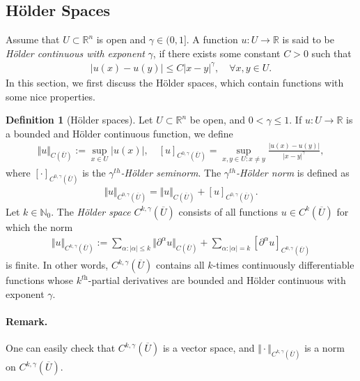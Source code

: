 \documentclass{article}
\numberwithin{equation}{section}
\newcommand{\bbR}{\mathbb{R}}
\newcommand{\ol}{\overline}
\theoremstyle{plain}
\theoremstyle{definition}
\newtheorem{definition}[theorem]{Definition}
\begin{document}
\subsection{Hölder Spaces}
Assume that $U\subset\bbR^n$ is open and $\gamma\in(0,1]$. A function $u:U\to\bbR$ is said to be \textit{Hölder continuous with exponent} $\gamma$, if there exists some constant $C>0$ such that
\begin{align*}
	\vert u(x)-u(y)\vert\leq C\vert x-y\vert^\gamma,\quad\forall x,y\in U.
\end{align*}
In this section, we first discuss the Hölder spaces, which contain functions with some nice properties.
\begin{definition}[Hölder spaces]\label{def:2.1}
Let $U\subset\bbR^n$ be open, and $0<\gamma\leq 1$. If $u:U\to\bbR$ is a bounded and Hölder continuous function, we define 
\begin{align*}
	\Vert u\Vert_{C(\overline{U})}:=\sup_{x\in U}\vert u(x)\vert,\quad [u]_{C^{0,\gamma}(\overline{U})}=\sup_{x,y\in U:x\neq y}\frac{\vert u(x)-u(y)\vert}{\vert x-y\vert^\gamma},
\end{align*}
where $[\cdot]_{C^{0,\gamma}(\overline{U})}$ is the \textit{$\gamma^{th}$-Hölder seminorm}. The \textit{$\gamma^{th}$-Hölder norm} is defined as
\begin{align*}
	\Vert u\Vert_{C^{0,\gamma}(\overline{U})}=	\Vert u\Vert_{C(\overline{U})}+[u]_{C^{0,\gamma}(\overline{U})}.
\end{align*}
Let $k\in\mathbb{N}_0$. The \textit{Hölder space} $C^{k,\gamma}(\overline{U})$ consists of all functions $u\in C^k(\ol{U})$ for which the norm
\begin{align*}
	\Vert u\Vert_{C^{k,\gamma}(\ol{U})}:=\sum_{\alpha:\vert\alpha\vert\leq k}\Vert \partial^\alpha u\Vert_{C(\ol{U})}+\sum_{\alpha:\vert\alpha\vert= k}[\partial^\alpha u]_{C^{0,\gamma}(\ol{U})}
\end{align*}
is finite. In other words, $C^{k,\gamma}(\overline{U})$ contains all $k$-times continuously differentiable functions whose $k^\textit{th}$-partial derivatives are bounded and Hölder continuous with exponent $\gamma$.
\end{definition}
\paragraph{Remark.} One can easily check that $C^{k,\gamma}(\overline{U})$ is a vector space, and $\Vert\cdot\Vert_{C^{k,\gamma}(\overline{U})}$ is a norm on $C^{k,\gamma}(\overline{U})$.
\end{document}
